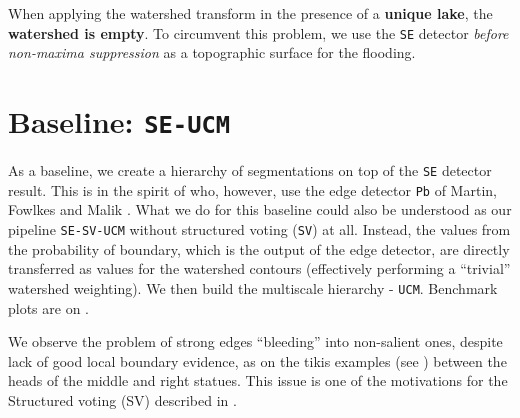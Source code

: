 When applying the watershed transform in the presence of a {\bf unique lake}, the {\bf watershed is empty}. To circumvent this problem, we use the {\tt SE} detector {\it before non-maxima suppression} as a topographic surface for the flooding.

\section{Baseline: {\tt SE-UCM}}
\label{sec:ch5-SE-UCM-baseline}
As a baseline, we create a hierarchy of segmentations on top of the {\tt SE} detector result. This is in the spirit of \cite{Arbelaez2006boundary} who, however, use the edge detector {\tt Pb} of Martin, Fowlkes and Malik \cite{Martin2004learning}. What we do for this baseline could also be understood %
as our pipeline {\tt SE-SV-UCM} without structured voting ({\tt SV}) at all. Instead, the values from the probability of boundary, which is the output of the edge detector, are directly transferred as values for the watershed contours (effectively performing a ``trivial'' watershed weighting). We then build the multiscale hierarchy - {\tt UCM}. Benchmark plots are on .

We observe the problem of strong edges ``bleeding'' into non-salient ones, despite lack of good local boundary evidence, as on the tikis examples (see ) between the heads of the middle and right statues. This issue is one of the motivations for the Structured voting (SV) described in .%

